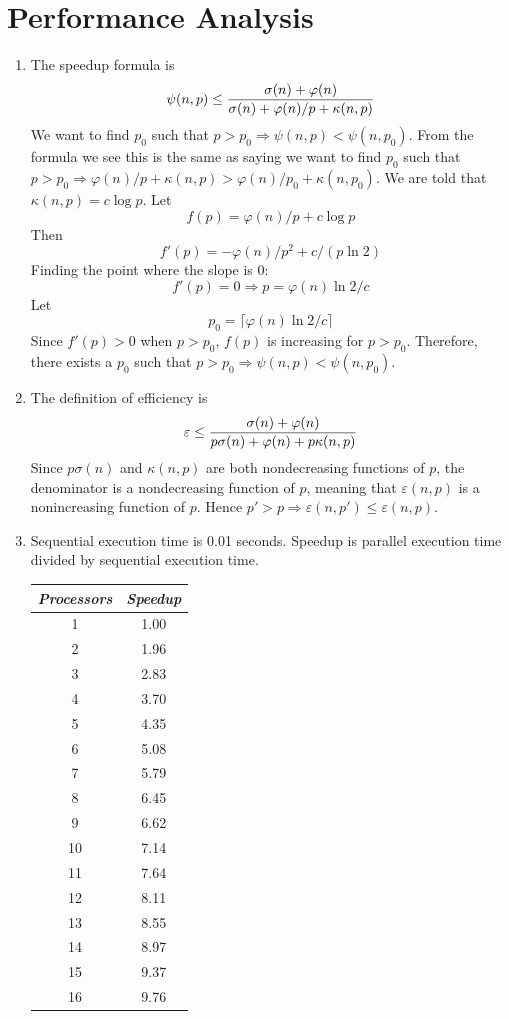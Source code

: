\chapter{Performance Analysis}

\begin{enumerate}
\item
The speedup formula is
$$\psi(n,p) \le
{{\sigma(n) + \varphi(n)}\over{\sigma(n) + \varphi(n)/p + \kappa(n,p)}}$$
We want to find $p_0$ such that $p > p_0 \Rightarrow \psi(n,p) < \psi(n,p_0)$.
From the formula we see this is the same as saying
we want to find $p_0$ such that
$p > p_0 \Rightarrow \varphi(n)/p + \kappa(n,p) >
                              \varphi(n)/p_0 + \kappa(n,p_0)$.
We are told that $\kappa(n,p) = c\log p$.
Let
$$f(p) = \varphi(n)/p + c\log p$$
Then
$$f'(p) = -\varphi(n)/p^2 + c/(p\ln 2)$$
Finding the point where the slope is 0:
$$f'(p) = 0 \Rightarrow p = \varphi(n)\ln{2}/c$$
Let
$$p_0 = \lceil\varphi(n)\ln{2}/c\rceil$$
Since $f'(p) > 0$ when $p > p_0$, $f(p)$ is increasing for $p > p_0$.
Therefore, there exists a $p_0$ such that $p > p_0 \Rightarrow
\psi(n,p) < \psi(n,p_0)$.

\item
The definition of efficiency is
$$\varepsilon \le
{{\sigma(n) + \varphi(n)}\over{p\sigma(n) + \varphi(n) + p\kappa(n,p)}}$$
Since $p\sigma(n)$ and $\kappa(n,p)$ are both nondecreasing functions of
$p$, the denominator is a nondecreasing function of $p$, meaning that
$\varepsilon(n,p)$ is a nonincreasing function of $p$.
Hence $p' > p \Rightarrow \varepsilon(n,p') \le \varepsilon(n,p)$.

\item Sequential execution time is 0.01 seconds.
Speedup is parallel execution time divided by sequential execution time.

\begin{tabular}{|c|c|}
\hline
{\it Processors}&{\it Speedup}\\
\hline
1 & 1.00 \\
2 & 1.96 \\
3 & 2.83 \\
4 & 3.70 \\
5 & 4.35 \\
6 & 5.08 \\
7 & 5.79 \\
8 & 6.45 \\
9 & 6.62 \\
10 & 7.14 \\
11 & 7.64 \\
12 & 8.11 \\
13 & 8.55 \\
14 & 8.97 \\
15 & 9.37 \\
16 & 9.76 \\
\hline
\end{tabular}


\end{enumerate}
